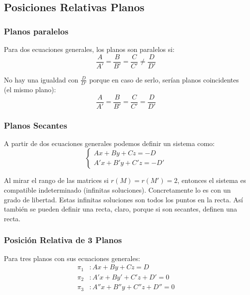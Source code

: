 \documentclass[arial,a4paper,print]{article}
\begin{document}
\pagebreak
\subsection{Posiciones Relativas Planos}

\subsubsection{Planos paralelos}
Para dos ecuaciones generales, los planos son paralelos si:
\begin{equation*}
	\frac{A}{A'} = \frac{B}{B'} = \frac{C}{C'} \neq \frac{D}{D'}
\end{equation*}

No hay una igualdad con $\frac{D}{D'}$ porque en caso de serlo, serían planos coincidentes (el mismo plano):
\begin{equation*}
	\frac{A}{A'} = \frac{B}{B'} = \frac{C}{C'} = \frac{D}{D'}
\end{equation*}

\subsubsection{Planos Secantes}

A partir de dos ecuaciones generales podemos definir un sistema como:
\begin{equation*}
	\begin{cases}
		Ax + By + Cz = -D \\
		A'x + B'y + C'z = -D'
	\end{cases}
\end{equation*}

Al mirar el rango de las matrices si $r(M) = r(M') = 2$, entonces el sistema es compatible indeterminado (infinitas soluciones). Concretamente lo es con un grado de libertad. Estas infinitas soluciones son todos los puntos en la recta. Así también se pueden definir una recta, claro, porque si son secantes, definen una recta.

\subsubsection{Posición Relativa de 3 Planos}

Para tres planos con sus ecuaciones generales:
\begin{align*}
	\pi_1&: Ax + By + Cz = D \\
	\pi_2&: A'x + By' + C'z + D' = 0 \\
	\pi_3&: A''x + B''y + C''z + D'' = 0 \\
\end{align*}
\end{document}
